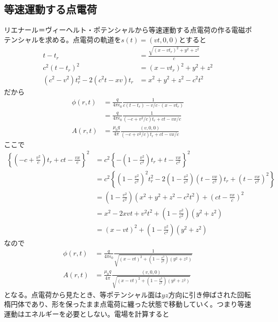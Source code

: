 \subsection{等速運動する点電荷}
    リエナール＝ヴィーヘルト・ポテンシャルから等速運動する点電荷の作る電磁ポテンシャルを求める。点電荷の軌道を$s(t) = (vt, 0, 0)$とすると
    \begin{align*}
        t - t_r &= \frac{\sqrt{(x - vt_r)^2 + y^2 + z^2}}{c}\\
        c^2(t - t_r)^2 &= (x - vt_r)^2 + y^2 + z^2\\
        (c^2 - v^2)t_r^2 - 2(c^2t - xv)t_r &= x^2 + y^2 + z^2 - c^2t^2
    \end{align*}
    だから
    \begin{align*}
        \phi(r, t)
        &= \frac{q}{4\pi\epsilon_0}\frac{1}{c(t - t_r) - v/c \cdot (x - vt_r)}\\
        &= \frac{q}{4\pi\epsilon_0}\frac{1}{(-c + v^2/c)t_r + ct - vx/c}\\
        A(r, t)
        &= \frac{\mu_0q}{4\pi}\frac{(v, 0, 0)}{(-c + v^2/c)t_r + ct - vx/c}
    \end{align*}
    ここで
    \begin{align*}
        \left\{\left(-c + \frac{v^2}{c}\right)t_r + ct - \frac{vx}{c}\right\}^2
        &= c^2\left\{-\left(1 - \frac{v^2}{c^2}\right)t_r + t - \frac{vx}{c^2}\right\}^2\\
        &= c^2\left\{\left(1 - \frac{v^2}{c^2}\right)^2t_r^2 - 2\left(1 - \frac{v^2}{c^2}\right)\left(t - \frac{vx}{c^2}\right)t_r + \left(t - \frac{vx}{c^2}\right)^2\right\}\\
        &= \left(1 - \frac{v^2}{c^2}\right)(x^2 + y^2 + z^2 - c^2t^2) + \left(ct - \frac{vx}{c}\right)^2\\
        &= x^2 - 2xvt + v^2t^2 + \left(1 - \frac{v^2}{c^2}\right)(y^2 + z^2)\\
        &= (x - vt)^2 + \left(1 - \frac{v^2}{c^2}\right)(y^2 + z^2)
    \end{align*}
    なので
    \begin{align*}
        \phi(r, t) &= \frac{q}{4\pi\epsilon_0}\frac{1}{\sqrt{(x - vt)^2 + \left(1 - \frac{v^2}{c^2}\right)(y^2 + z^2)}}\\
        A(r, t) &= \frac{\mu_0q}{4\pi}\frac{(v, 0, 0)}{\sqrt{(x - vt)^2 + \left(1 - \frac{v^2}{c^2}\right)(y^2 + z^2)}}
    \end{align*}
    となる。点電荷から見たとき、等ポテンシャル面は$yz$方向に引き伸ばされた回転楕円体であり、形を保ったまま点電荷に纏った状態で移動していく。つまり等速運動はエネルギーを必要としない。電場を計算すると

